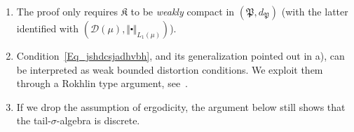 \documentclass[AHL,Unicode,longabstracts]{cedram}
\newcommand{\clD}{\mathcal{D}}
\newcommand{\frkK}{\mathfrak{K}}
\newcommand{\frkP}{\mathfrak{P}}
\newcommand*{\alphenumi}{\renewcommand*{\theenumi}{\alph{enumi}}}
\begin{document}
\begin{rema}\leavevmode
\begin{enumerate}\alphenumi
\item The proof only requires $\frkK$ to be \emph{weakly} compact in $(\frkP,d_{\frkP})$ (with the latter identified with $(\clD(\mu),\Vert \centerdot\Vert _{L_{1}(\mu)})$).
\item Condition~\eqref{Eq_jshdcsjadhvbh}, and its generalization pointed out in a), can be interpreted as weak bounded distortion conditions. We exploit them through a Rokhlin type argument, see~\cite{Ro}.

\item If we drop the assumption of ergodicity, the argument below still shows that the tail-$\sigma$-algebra is discrete.
\end{enumerate}
\end{rema}
\end{document}
